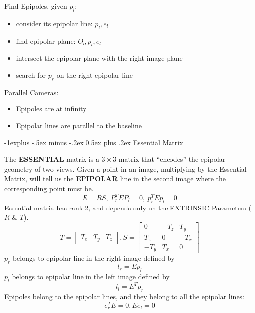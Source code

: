 \documentclass[10pt,landscape]{article}
\makeatletter
\renewcommand{\subsection}{\@startsection{subsection}{2}{0mm}%
                                {-1explus -.5ex minus -.2ex}%
                                {0.5ex plus .2ex}%
                                {\normalfont\normalsize\bfseries}}
\makeatother
\begin{document}
\begin{multicols}{3}
Find Epipoles, given $p_l$:
\begin{itemize}
    \item consider its epipolar line: $p_l, e_l$
    \item find epipolar plane: $O_l, p_l, e_l$
    \item intersect the epipolar plane with the right image plane
    \item search for $p_r$ on the right epipolar line
\end{itemize}
Parallel Cameras: 
\begin{itemize}
    \item Epipoles are at infinity
    \item Epipolar lines are parallel to the baseline
\end{itemize}


\subsection{Essential Matrix}

The \textbf{ESSENTIAL} matrix is a $3\times3$ matrix that “encodes” the epipolar geometry of two views. Given a point in an image, multiplying by the Essential Matrix, will tell us the \textbf{EPIPOLAR} line in the second image where the corresponding point must be.\\
\begin{equation*}
    E=RS,\ P^T_rEP_l = 0,\ p^T_rEp_l = 0 
\end{equation*}
Essential matrix has rank 2, and depends only on the EXTRINSIC Parameters ($R$ \& $T$).
\begin{equation*}
T =\left[ \begin{array}{ccc}
T_x & T_y & T_z
\end{array} \right ], S = \left[ \begin{array}{ccc}
0 & -T_z & T_y\\
T_z & 0 & -T_x\\
-T_y & T_x & 0
\end{array} \right ]
\end{equation*}
$p_r$ belongs to epipolar line in the right image defined by
\begin{equation*}
    l_r = Ep_l
\end{equation*}
$p_l$ belongs to epipolar line in the left image defined by 
\begin{equation*}
    l_l = E^Tp_r
\end{equation*}
Epipoles belong to the epipolar lines, and they belong to all the epipolar lines:
\begin{equation*}
    e^T_rE=0, Ee_l=0
\end{equation*}




\end{multicols}
\end{document}
